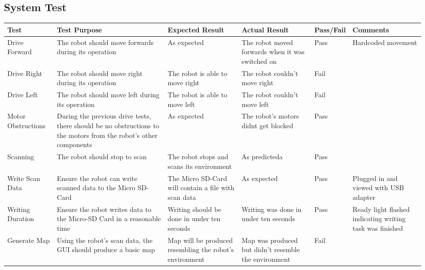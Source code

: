 \begin{landscape}
				\subsection{System Test}
				\begin{table}[h!]
					\centering
					\label{systemintergrationtestingtable}
					\begin{tabular}{| p{2.5cm} | p{5cm} | p{4cm} | p{4cm} | p{1.5cm} | p{2cm} |} 
						\hline
						Test & Test Purpose & Expected Result & Actual Result & Pass/Fail & Comments \\ [0.5ex] 
						\hline
						Drive Forward & The robot should move forwards during its operation & As expected & The robot moved forwards when it was switched on & Pass & Hardcoded movement  \\
						
						Drive Right & The robot should move right during its operation & The robot is able to move right & The robot couldn't move right & Fail &   \\
						
						Drive Left & The robot should move left during its operation & The robot is able to move left & The robot couldn't move left & Fail &   \\
						
						Motor Obstructions & During the previous drive tests, there should be no obstructions to the motors from the robot's other components & As expected & The robot's motors didnt get blocked & Pass &   \\
						
						Scanning & The robot should stop to scan & The robot stops and scans its environment & As predicteda & Pass &   \\ 
						
						Write Scan Data & Ensure the robot can write scanned data to the Micro SD-Card & The Micro SD-Card will contain a file with scan data & As expected & Pass & Plugged in and viewed with USB adapter  \\
						 
						Writing Duration & Ensure the robot writes data to the Micro-SD Card in a reasonable time  & Writing should be done in under ten seconds & Writing was done in under ten seconds & Pass & Ready light flashed indicating writing task was finished  \\ 
						
						Generate Map & Using the robot's scan data, the GUI should produce a basic map & Map will be produced resembling the robot's environment & Map was produced but didn't resemble the environment & Fail &  \\ 
						

\end{tabular}
\end{table}
\end{landscape}
